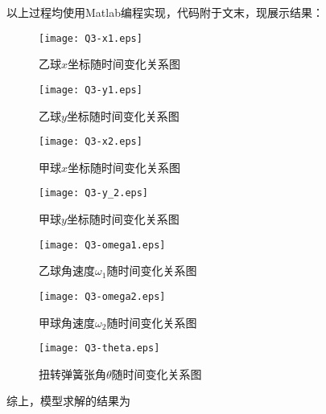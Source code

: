 \documentclass[a4paper,c5size,twoside,UTF8]{ctexart} %
\numberwithin{equation}{section}   %
\begin{document}
\newpage

以上过程均使用Matlab编程实现，代码附于文末，现展示结果：


\begin{figure}[H]
	\centering
	\texttt{[image: Q3-x1.eps]}
	\caption{乙球$x$坐标随时间变化关系图}
\end{figure}


\begin{figure}[H]
	\centering
	\texttt{[image: Q3-y1.eps]}
	\caption{乙球$y$坐标随时间变化关系图}
\end{figure}

\begin{figure}[H]
	\centering
	\texttt{[image: Q3-x2.eps]}
	\caption{甲球$x$坐标随时间变化关系图}
\end{figure}

\begin{figure}[H]
	\centering
	\texttt{[image: Q3-y\_2.eps]}
	\caption{甲球$y$坐标随时间变化关系图}
\end{figure}

\begin{figure}[H]
	\centering
	\texttt{[image: Q3-omega1.eps]}
	\caption{乙球角速度$\omega_1$随时间变化关系图}
\end{figure}

\begin{figure}[H]
	\centering
	\texttt{[image: Q3-omega2.eps]}
	\caption{甲球角速度$\omega_2$随时间变化关系图}
\end{figure}


\begin{figure}[H]
	\centering
	\texttt{[image: Q3-theta.eps]}
	\caption{扭转弹簧张角$\theta$随时间变化关系图}
\end{figure}


综上，模型求解的结果为
\end{document}
